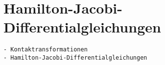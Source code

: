 %
%
%
\section{Hamilton-Jacobi-Differentialgleichungen
\label{buch:mechanik:section:jacobi}}

\begin{verbatim}
- Kontaktransformationen
- Hamilton-Jacobi-Differentialgleichungen
\end{verbatim}
